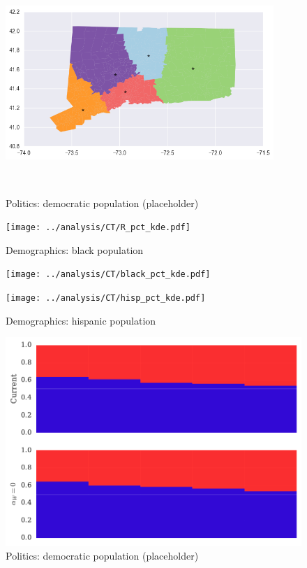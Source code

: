 \begin{figure}[htb!]
\includegraphics[width=4in,height=3in,keepaspectratio]{../maps/CT/static/0_25_after.png}
\end{figure}

\clearpage
\newpage

\begin{figure}[htb!] \centering
\caption{ Politics: democratic population (placeholder)}
\texttt{[image: ../analysis/CT/R\_pct\_kde.pdf]}
\caption{ Demographics: black population }
\texttt{[image: ../analysis/CT/black\_pct\_kde.pdf]}
\caption{ Demographics: hispanic population }
\texttt{[image: ../analysis/CT/hisp\_pct\_kde.pdf]}
\end{figure}

\clearpage
\newpage

\begin{figure}[htb!] \centering
\caption{ Politics: democratic population (placeholder)}
\includegraphics[width=6in]{../analysis/CT/barplot.pdf}
\end{figure}

